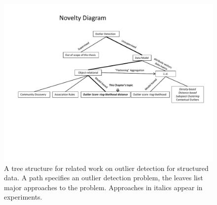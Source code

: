 	\begin{figure}
		\centering
		\includegraphics[width=1\textwidth] {figures/novelty-sep.pdf}
		\caption{A tree structure for related work on outlier detection for structured data. A path specifies an outlier detection problem, the leaves list major approaches to the problem. Approaches in italics appear in experiments.
			\label{fig:novelty}}
	\end{figure}
%	
%	
%	
